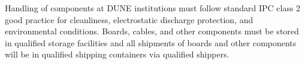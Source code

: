 Handling of  components at DUNE institutions must follow standard IPC class 2 good practice for cleanliness, electrostatic discharge protection, and environmental conditions. Boards, cables, and other  components must be stored in qualified storage facilities and all shipments of boards and other components will be in qualified shipping containers via qualified shippers.
